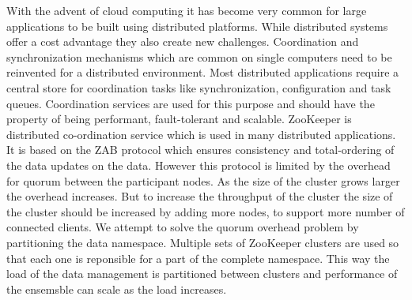 With the advent of cloud computing it has become very common for large applications to be built using distributed platforms. While distributed systems offer a cost advantage they also create new challenges. Coordination and synchronization mechanisms which are common on single computers need to be reinvented for a distributed environment. Most distributed applications require a central store for coordination tasks like synchronization, configuration and task queues. Coordination services are used for this purpose and should have the property of being performant, fault-tolerant and scalable. ZooKeeper is distributed co-ordination service which is used in many distributed applications. It is based on the ZAB protocol which ensures consistency and total-ordering of the data updates on the data. However this protocol is limited by the overhead for quorum between the participant nodes. As the size of the cluster grows larger the overhead increases. But to increase the throughput of the cluster the size of the cluster should be increased by adding more nodes, to support more number of connected clients. We attempt to solve the quorum overhead problem by partitioning the data namespace. Multiple sets of ZooKeeper clusters are used so that each one is reponsible for a part of the complete namespace.  This way the load of the data management is partitioned between clusters and performance of the ensemsble can scale as the load increases.
